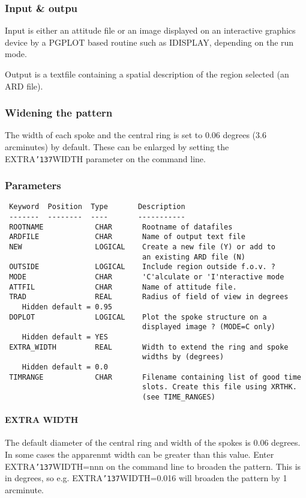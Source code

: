 \documentclass{book}
\renewcommand{\_}{{\tt\char'137}}     %
\begin{document}
\subsubsection{Input \& outpu}
Input is either an attitude file or an image displayed on an
interactive graphics device by a PGPLOT based routine such as IDISPLAY,
depending on the run mode.

Output is a textfile containing a spatial description of the region
selected (an ARD file).

\subsubsection{Widening the pattern}
The width of each spoke and the central ring is set to 0.06
degrees (3.6 arcminutes) by default. These can be enlarged by setting
the EXTRA\_WIDTH parameter on the command line.

\subsubsection{Parameters}
\begin{verbatim}
 Keyword  Position  Type       Description
 -------  --------  ----       -----------
 ROOTNAME            CHAR       Rootname of datafiles
 ARDFILE             CHAR       Name of output text file
 NEW                 LOGICAL    Create a new file (Y) or add to
                                an existing ARD file (N)
 OUTSIDE             LOGICAL    Include region outside f.o.v. ?
 MODE                CHAR       'C'alculate or 'I'nteractive mode
 ATTFIL              CHAR       Name of attitude file.
 TRAD                REAL       Radius of field of view in degrees
    Hidden default = 0.95
 DOPLOT              LOGICAL    Plot the spoke structure on a
                                displayed image ? (MODE=C only)
    Hidden default = YES
 EXTRA_WIDTH         REAL       Width to extend the ring and spoke
                                widths by (degrees)
    Hidden default = 0.0
 TIMRANGE            CHAR       Filename containing list of good time
                                slots. Create this file using XRTHK.
                                (see TIME_RANGES)

\end{verbatim}\paragraph{EXTRA WIDTH}
The default diameter of the central ring and width of the
spokes is 0.06 degrees. In some cases the apparenmt width can be greater
than this value. Enter EXTRA\_WIDTH=nnn on the command line to
broaden the pattern. This is in degrees, so e.g. EXTRA\_WIDTH=0.016
will broaden the pattern by 1 arcminute.
\end{document}
